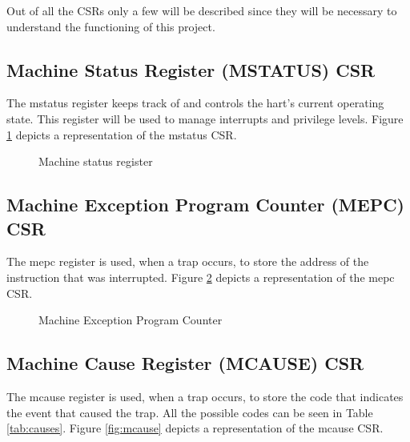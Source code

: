 Out of all the CSRs only a few will be described since they will be necessary to
understand the functioning of this project.

\subsection{Machine Status Register (MSTATUS) CSR}
\label{subsec:mstatus}

The mstatus register keeps track of and controls the hart’s current operating
state. This register will be used to manage interrupts and privilege levels.
Figure \ref{fig:mstatus} depicts a representation of the mstatus CSR.

\begin{figure}[htbp]
  \centering
  \def\stackalignment{r} %
  {\scriptsize }
  \caption{Machine status register}
  \label{fig:mstatus}
\end{figure}

\subsection{Machine Exception Program Counter (MEPC) CSR}
\label{subsec:mepc}

The mepc register is used, when a trap occurs, to store the address of the
instruction that was interrupted. Figure \ref{fig:mepc} depicts a representation
of the mepc CSR.

\begin{figure}[htbp]
  \centering
  \def\stackalignment{r} %
  {\scriptsize }
  \caption{Machine Exception Program Counter}
  \label{fig:mepc}
\end{figure}

\subsection{Machine Cause Register (MCAUSE) CSR}
\label{subsec:mcause}

The mcause register is used, when a trap occurs, to store the code that indicates
the event that caused the trap. All the possible codes can be seen in Table
\ref{tab:causes}. Figure \ref{fig:mcause} depicts a representation of the mcause
CSR.

